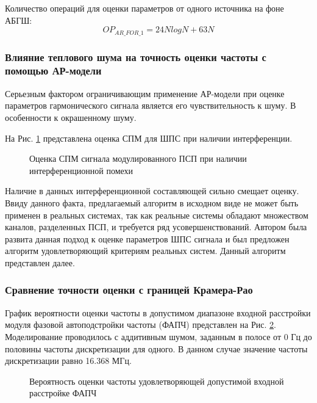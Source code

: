 Количество операций для оценки параметров от одного источника на фоне АБГШ:
\begin{equation}
	OP_{AR\_FOR\_1} = 24NlogN + 63N
\end{equation}

\subsubsection{Влияние теплового шума на точность оценки частоты с помощью АР-модели}
Серьезным фактором ограничивающим применение АР-модели при оценке параметров гармонического сигнала является
его чувствительность к шуму. В особенности к окрашенному шуму.

На Рис. \ref{pic:lpc_psd_2} представлена оценка СПМ для ШПС при наличии интерференции.
\begin{figure}[h]
	\center{}
	\caption{Оценка СПМ сигнала модулированного ПСП при наличии интерференционной помехи}
	\label{pic:lpc_psd_2}
\end{figure}

Наличие в данных интерференционной составляющей сильно смещает оценку. Ввиду данного факта, предлагаемый алгоритм в исходном виде
не может быть применен в реальных системах, так как реальные системы обладают множеством каналов, разделенных ПСП, и требуется ряд усовершенствований.
Автором была развита данная подход к оценке параметров ШПС сигнала и был предложен алгоритм удовлетворяющий критериям реальных систем. Данный
алгоритм представлен далее.

\subsubsection{Сравнение точности оценки с границей Крамера-Рао}
График вероятности оценки частоты в допустимом диапазоне входной расстройки модуля фазовой автоподстройки частоты (ФАПЧ) представлен на Рис.
\ref{pic:lpc_for_1_probability}. Моделирование проводилось с аддитивным шумом, заданным в полосе от 0 Гц до
половины частоты дискретизации для одного. В данном случае значение частоты дискретизации равно 16.368 МГц.
\begin{figure}[H]
\center{}
	\caption{Вероятность оценки частоты удовлетворяющей допустимой входной расстройке ФАПЧ}
	\label{pic:lpc_for_1_probability}
\end{figure}

